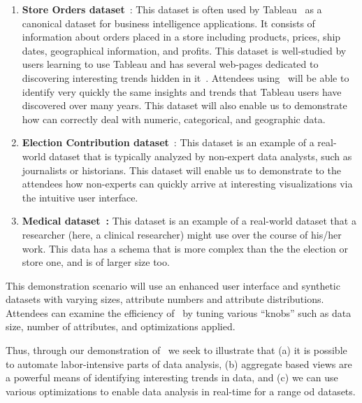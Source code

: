 \begin{enumerate}
  \item {\bf Store Orders dataset}~\cite{superstore}: This dataset is
    often used by Tableau~\cite{tableau} as a canonical dataset for
    business intelligence applications. It consists of information
    about orders placed in a store including products, prices, ship
    dates, geographical information, and profits. This dataset
    is well-studied by users learning to use Tableau and has several
    web-pages dedicated to discovering interesting trends hidden in
    it~\cite{website}. Attendees using \SeeDB\ will be able
    to identify very quickly the same insights and trends that Tableau
    users have discovered over many years. This dataset will also
    enable us to demonstrate how \SeeDB can correctly deal with
    numeric, categorical, and geographic data.
  \item {\bf Election Contribution dataset}~\cite{election_data}: This dataset
  is an example of a real-world dataset that is typically analyzed by
    non-expert data analysts, such as journalists or historians. This
    dataset will enable us to demonstrate to the attendees how
    non-experts can quickly arrive at interesting visualizations via
    the intuitive user interface.
  \item {\bf Medical dataset~\cite{mimic}:} This dataset is an example of a
    real-world dataset that a researcher (here, a clinical researcher)
    might use over the course of his/her work. This data has a schema
    that is more complex than the the election or store one, and is of
    larger size too.  
\end{enumerate}

 This demonstration
scenario will use an enhanced user interface and synthetic datasets with varying
sizes, attribute numbers and attribute distributions. Attendees can examine the
efficiency of \SeeDB\ by tuning various ``knobs'' such as data size, number of
attributes, and optimizations applied. 

Thus, through our demonstration of \SeeDB\, we seek to illustrate that (a) it is
possible to automate labor-intensive parts of data analysis, (b) aggregate based
views are a powerful means of identifying interesting trends in data, and (c) we
can use various optimizations to enable data analysis in real-time for a range
od datasets.

